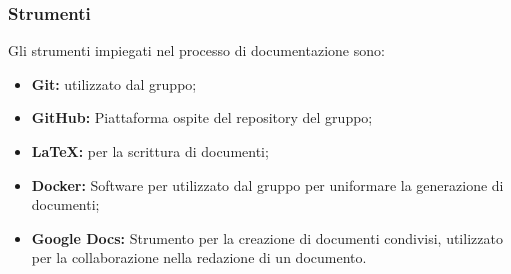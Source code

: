 \subsubsection{Strumenti}
Gli strumenti impiegati nel processo di documentazione sono:
\begin{itemize}
  \item \textbf{Git:}  utilizzato dal gruppo;
  \item \textbf{GitHub:} Piattaforma ospite del repository del gruppo;
  \item \textbf{LaTeX:}  per la scrittura di documenti;
  \item \textbf{Docker:} Software per  utilizzato dal gruppo per uniformare la generazione di documenti;
  \item \textbf{Google Docs:} Strumento per la creazione di documenti condivisi, utilizzato per la collaborazione nella redazione di un documento.
\end{itemize}

